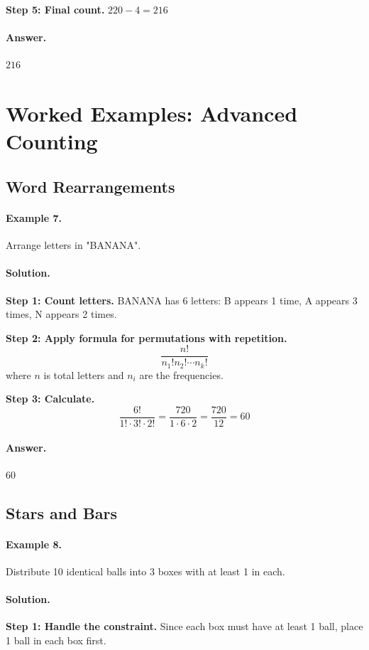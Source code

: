 \documentclass[12pt]{extarticle}
\begin{document}
\textbf{Step 5: Final count.} $220 - 4 = 216$

\paragraph{Answer.} $\boxed{216}$

\section{Worked Examples: Advanced Counting}

\subsection{Word Rearrangements}

\paragraph{Example 7.} Arrange letters in "BANANA".

\paragraph{Solution.}
\textbf{Step 1: Count letters.} BANANA has 6 letters: B appears 1 time, A appears 3 times, N appears 2 times.

\textbf{Step 2: Apply formula for permutations with repetition.} 
\[
\frac{n!}{n_1! n_2! \cdots n_k!}
\]
where $n$ is total letters and $n_i$ are the frequencies.

\textbf{Step 3: Calculate.}
\[
\frac{6!}{1! \cdot 3! \cdot 2!} = \frac{720}{1 \cdot 6 \cdot 2} = \frac{720}{12} = 60
\]

\paragraph{Answer.} $\boxed{60}$

\subsection{Stars and Bars}

\paragraph{Example 8.} Distribute 10 identical balls into 3 boxes with at least 1 in each.

\paragraph{Solution.}
\textbf{Step 1: Handle the constraint.} Since each box must have at least 1 ball, place 1 ball in each box first.
\end{document}
